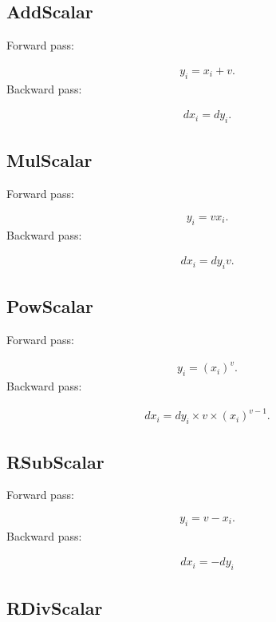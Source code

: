 \documentclass{article}
\begin{document}
\subsection{AddScalar}

Forward pass:

\begin{eqnarray}
  y_i = x_i + v.
\end{eqnarray}
%
Backward pass:

\begin{eqnarray}
  dx_i = dy_i.
\end{eqnarray}


\subsection{MulScalar}

Forward pass:

\begin{eqnarray}
  y_i = v x_i.
\end{eqnarray}
%
Backward pass:

\begin{eqnarray}
  dx_i = dy_i v.
\end{eqnarray}


\subsection{PowScalar}

Forward pass:

\begin{eqnarray}
  y_i = (x_i) ^ v.
\end{eqnarray}
%
Backward pass:

\begin{eqnarray}
  dx_i = dy_i \times v \times (x_i) ^ {v - 1}.
\end{eqnarray}


\subsection{RSubScalar}

Forward pass:

\begin{eqnarray}
  y_i = v - x_i.    
\end{eqnarray}
%
Backward pass:

\begin{eqnarray}
  dx_i = - dy_i 
\end{eqnarray}


\subsection{RDivScalar}
\end{document}
